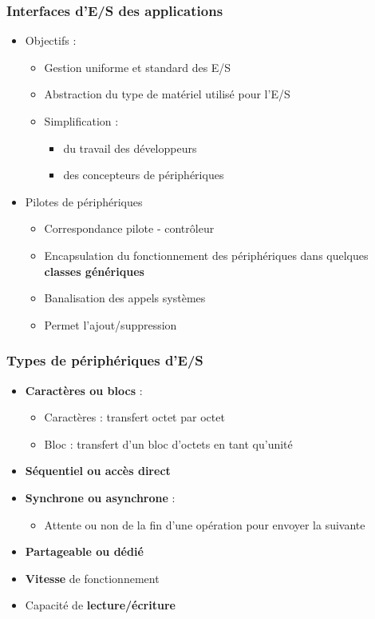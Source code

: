 \begin{frame}
\frametitle{Interfaces d'E/S des applications}
\begin{itemize}
\item Objectifs :
\begin{itemize}
\item Gestion uniforme et standard des E/S
\item Abstraction du type de matériel utilisé pour l'E/S
\item Simplification :
\begin{itemize}
\item du travail des développeurs
\item des concepteurs de périphériques
\end{itemize}
\end{itemize}

\item Pilotes de périphériques
\begin{itemize}
\item Correspondance pilote - contrôleur
\item Encapsulation du fonctionnement des périphériques dans quelques \textbf{classes génériques}
\item Banalisation des appels systèmes
\item Permet l'ajout/suppression
\end{itemize}
\end{itemize}
\end{frame}

\begin{frame}
\frametitle{Types de périphériques d'E/S}
\begin{itemize}
\item \textbf{Caractères ou blocs} :
\begin{itemize}
\item Caractères : transfert octet par octet
\item Bloc : transfert d'un bloc d'octets en tant qu'unité
\end{itemize}
\item \textbf{Séquentiel ou accès direct}
\item \textbf{Synchrone ou asynchrone} :
\begin{itemize}
\item Attente ou non de la fin d'une opération pour envoyer la suivante
\end{itemize}
\item \textbf{Partageable ou dédié}
\item \textbf{Vitesse} de fonctionnement
\item Capacité de \textbf{lecture/écriture}
\end{itemize}
\end{frame}

